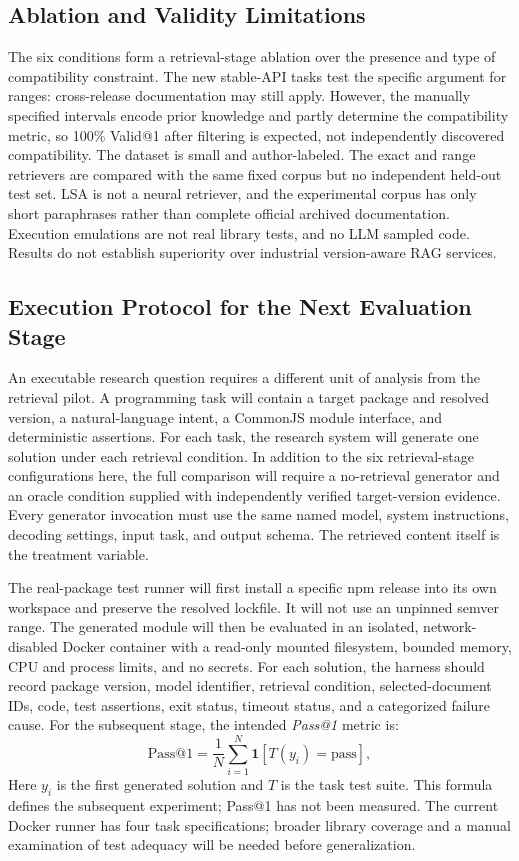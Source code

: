 \documentclass[conference]{IEEEtran}
\begin{document}
\subsection{Ablation and Validity Limitations}
The six conditions form a retrieval-stage ablation over the presence and type of compatibility constraint. The new stable-API tasks test the specific argument for ranges: cross-release documentation may still apply. However, the manually specified intervals encode prior knowledge and partly determine the compatibility metric, so 100\% Valid@1 after filtering is expected, not independently discovered compatibility. The dataset is small and author-labeled. The exact and range retrievers are compared with the same fixed corpus but no independent held-out test set. LSA is not a neural retriever, and the experimental corpus has only short paraphrases rather than complete official archived documentation. Execution emulations are not real library tests, and no LLM sampled code. Results do not establish superiority over industrial version-aware RAG services.


\subsection{Execution Protocol for the Next Evaluation Stage}
An executable research question requires a different unit of analysis from the retrieval pilot. A programming task will contain a target package and resolved version, a natural-language intent, a CommonJS module interface, and deterministic assertions. For each task, the research system will generate one solution under each retrieval condition. In addition to the six retrieval-stage configurations here, the full comparison will require a no-retrieval generator and an oracle condition supplied with independently verified target-version evidence. Every generator invocation must use the same named model, system instructions, decoding settings, input task, and output schema. The retrieved content itself is the treatment variable.

The real-package test runner will first install a specific npm release into its own workspace and preserve the resolved lockfile. It will not use an unpinned semver range. The generated module will then be evaluated in an isolated, network-disabled Docker container with a read-only mounted filesystem, bounded memory, CPU and process limits, and no secrets. For each solution, the harness should record package version, model identifier, retrieval condition, selected-document IDs, code, test assertions, exit status, timeout status, and a categorized failure cause. 
For the subsequent stage, the intended \emph{Pass@1} metric is:
\begin{equation}
 \mathrm{Pass@1}=\frac{1}{N}\sum_{i=1}^{N}\mathbf{1}[T(y_i)=\mathrm{pass}],
\end{equation}
Here $y_i$ is the first generated solution and $T$ is the task test suite. This formula defines the subsequent experiment; Pass@1 has not been measured. The current Docker runner has four task specifications; broader library coverage and a manual examination of test adequacy will be needed before generalization.
\end{document}
